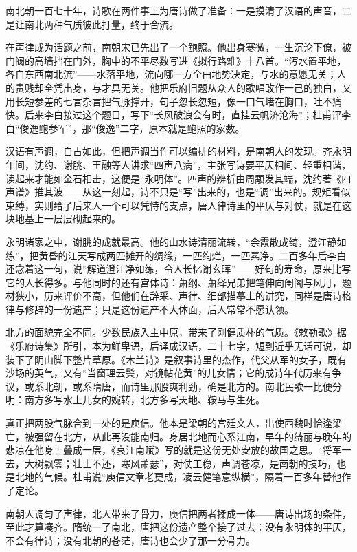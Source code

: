 
\begin{intro}
南北朝一百七十年，诗歌在两件事上为唐诗做了准备：一是摸清了汉语的声音，二是让南北两种气质彼此打量，终于合流。

在声律成为话题之前，南朝宋已先出了一个鲍照。他出身寒微，一生沉沦下僚，被门阀的高墙挡在门外，胸中的不平尽数写进《拟行路难》十八首。“泻水置平地，各自东西南北流”——水落平地，流向哪一方全由地势决定，与水的意愿无关；人的贵贱却全凭出身，与才具无关。他把乐府旧题从众人的歌唱改作一己的独白，又用长短参差的七言杂言把气脉撑开，句子忽长忽短，像一口气堵在胸口，吐不痛快。后来李白接过这个题目，写下“长风破浪会有时，直挂云帆济沧海”；杜甫评李白“俊逸鲍参军”，那“俊逸”二字，原本就是鲍照的家数。

汉语有声调，自古如此，但把声调当作可以编排的材料，是南朝人的发现。齐永明年间，沈约、谢朓、王融等人讲求“四声八病”，主张写诗要平仄相间、轻重相谐，读起来才能如金石相击，这便是“永明体”。四声的辨析由周颙发其端，沈约著《四声谱》推其波——从这一刻起，诗不只是“写”出来的，也是“调”出来的。规矩看似束缚，实则给了后来人一个可以凭恃的支点，唐人律诗里的平仄与对仗，就是在这块地基上一层层砌起来的。

永明诸家之中，谢朓的成就最高。他的山水诗清丽流转，“余霞散成绮，澄江静如练”，把黄昏的江天写成两匹摊开的绸缎，一匹绚烂，一匹素净。二百多年后李白还念着这一句，说“解道澄江净如练，令人长忆谢玄晖”——好句的寿命，原来比写它的人长得多。与他同时的还有宫体诗：萧纲、萧绎兄弟把笔伸向闺阁与风月，题材狭小，历来评价不高，但他们在辞采、声律、细部描摹上的讲究，同样是唐诗格律与修辞的一份遗产；只是这份遗产不大体面，后人常常不愿认领。

北方的面貌完全不同。少数民族入主中原，带来了刚健质朴的气质。《敕勒歌》据《乐府诗集》所引，本为鲜卑语，后译成汉语，二十七字，短到近乎无话可说，却装下了阴山脚下整片草原。《木兰诗》是叙事诗里的杰作，代父从军的女子，既有沙场的英气，又有“当窗理云鬓，对镜帖花黄”的儿女情；它的成诗年代历来有争议，或系北朝，或系隋唐，而诗里那股爽利劲，确是北方的。南北民歌一比便分明：南方多写水上儿女的婉转，北方多写天地、鞍马与生死。

真正把两股气脉合到一处的是庾信。他本是梁朝的宫廷文人，出使西魏时恰逢梁亡，被强留在北方，从此再没能南归。身居北地而心系江南，早年的绮丽与晚年的悲凉在他身上叠成一层，《哀江南赋》写的就是这份无处安放的故国之思。“将军一去，大树飘零；壮士不还，寒风萧瑟”，对仗工稳，声调苍凉，是南朝的技巧，也是北地的气候。杜甫说“庾信文章老更成，凌云健笔意纵横”，隔着一百多年替他作了定论。

南朝人调匀了声律，北人带来了骨力，庾信把两者揉成一体——唐诗出场的条件，至此才算凑齐。隋统一了南北，唐把这份遗产整个接了过去：没有永明体的平仄，不会有律诗；没有北朝的苍茫，唐诗也会少了那一分骨力。
\end{intro}
